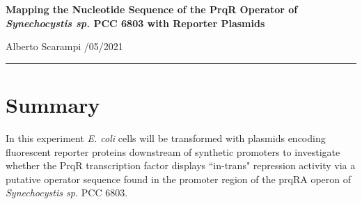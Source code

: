 




\begin{Large}
\textbf{Mapping the Nucleotide Sequence of the PrqR Operator of \textit{Synechocystis sp.} PCC 6803 with Reporter Plasmids}
\newline
\end{Large}
Alberto Scarampi
/05/2021\\
\noindent\rule{\textwidth}{0.4pt}

\section*{Summary}
In this experiment \textit{E. coli} cells will be transformed with plasmids encoding fluorescent reporter proteins downstream of synthetic promoters to investigate whether the PrqR transcription factor displays ``in-trans" repression activity via a putative operator sequence found in the promoter region of the prqRA operon of \textit{Synechocystis sp.} PCC 6803.

